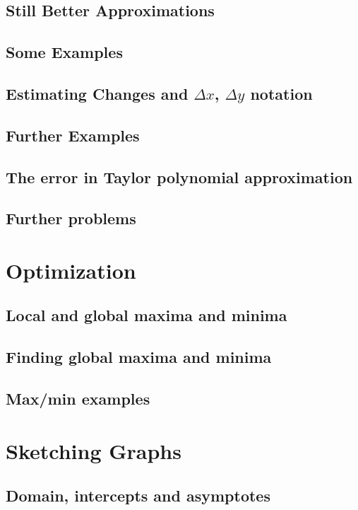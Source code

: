 \documentclass[12pt,letterpaper]{book}
\begin{document}
\subsection{Still Better Approximations}

\subsection{Some Examples}

\subsection{Estimating Changes and $\Delta x$, $\Delta y$ notation}

\subsection{Further Examples}

\subsection{The error in Taylor polynomial approximation}

\subsection{Further problems}

\section{Optimization}
\subsection{Local and global maxima and minima}

\subsection{Finding global maxima and minima}

\subsection{Max/min examples}

\section{Sketching Graphs}
\subsection{Domain, intercepts and asymptotes}

\end{document}
